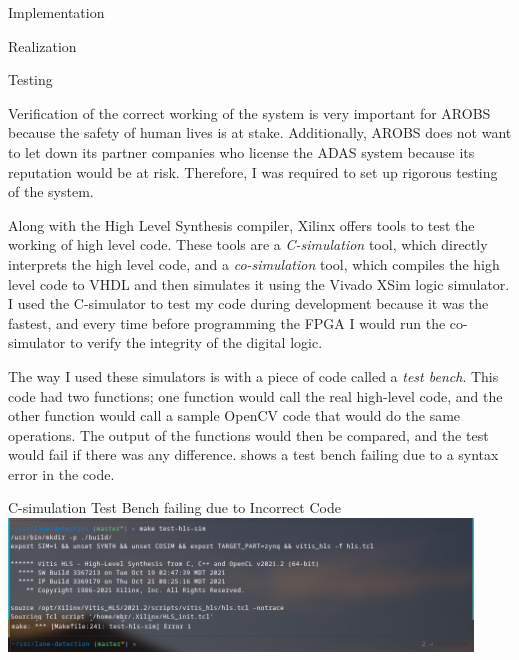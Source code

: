 \documentclass{matthijs}
\begin{document}
\begin{hoofdstuk}{Implementation}
\begin{paragraaf}{Realization}
			
		\end{paragraaf}

		\begin{paragraaf}{Testing}

			Verification of the correct working of the system is very important for AROBS because the safety of human lives is at stake.
			Additionally, AROBS does not want to let down its partner companies who license the ADAS system because its reputation would be at risk.
			Therefore, I was required to set up rigorous testing of the system.
			
			Along with the High Level Synthesis compiler, Xilinx offers tools to test the working of high level code.
			These tools are a \textit{C-simulation} tool, which directly interprets the high level code, and a \textit{co-simulation} tool, which compiles the high level code to VHDL and then simulates it using the Vivado XSim logic simulator.
			I used the C-simulator to test my code during development because it was the fastest, and every time before programming the FPGA I would run the co-simulator to verify the integrity of the digital logic.

			The way I used these simulators is with a piece of code called a \textit{test bench}.
			This code had two functions; one function would call the real high-level code, and the other function would call a sample OpenCV code that would do the same operations.
			The output of the functions would then be compared, and the test would fail if there was any difference.
			 shows a test bench failing due to a syntax error in the code.
			
			\begin{figuur}{C-simulation Test Bench failing due to Incorrect Code}
				\includegraphics[width=0.925\textwidth]{csim-err5.png}
			\end{figuur}
			
		\end{paragraaf}

	\end{hoofdstuk}
	
\end{document}
